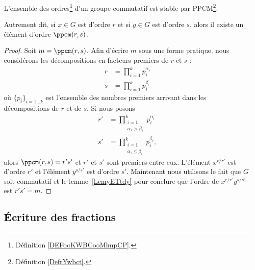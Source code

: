 \begin{lemma}       \label{LemqAUBYn}
    L'ensemble des ordres\footnote{Définition \ref{DEFooKWBCooMlmpCP}.} d'un groupe commutatif est stable par PPCM\footnote{Définition \ref{DefrYwbct}.}.

    Autrement dit, si \( x\in G\) est d'ordre \( r\) et si \( y\in G\) est d'ordre \( s\), alors il existe un élément d'ordre \( \ppcm(r,s)\).
\end{lemma}

\begin{proof}
    Soit \( m=\ppcm(r,s)\). Afin d'écrire \( m\) sous une forme pratique, nous considérons les décompositions en facteurs premiers de \( r\) et \( s\) :
    \begin{subequations}
        \begin{align}
            r&=\prod_{i=1}^kp_i^{\alpha_i}\\
            s&=\prod_{i=1}^kp_i^{\beta_i}
        \end{align}
    \end{subequations}
    où \( \{ p_i \}_{i=1\ldots k}\) est l'ensemble des nombres premiers arrivant dans les décompositions de \( r\) et de \( s\). Si nous posons
    \begin{subequations}
        \begin{align}
            r'&=\prod_{\substack{i=1\\\alpha_1>\beta_i}}^kp_i^{\alpha_i}\\
            s'&=\prod_{\substack{i=1\\\alpha_i\leq \beta_i}}^kp_i^{\beta_i},
        \end{align}
    \end{subequations}
    alors \( \ppcm(r,s)=r's'\) et \( r'\) et \( s'\) sont premiers entre eux. L'élément \( x^{r/r'}\) est d'ordre \( r'\) et l'élément \( y^{s/s'}\) est d'ordre \( s'\). Maintenant nous utilisons le fait que \( G\) soit commutatif et le lemme~\ref{LemyETtdy} pour conclure que l'ordre de \( x^{r/r'}y^{s/s'}\) est \( r's'=m\).
\end{proof}

\subsection{Écriture des fractions}

